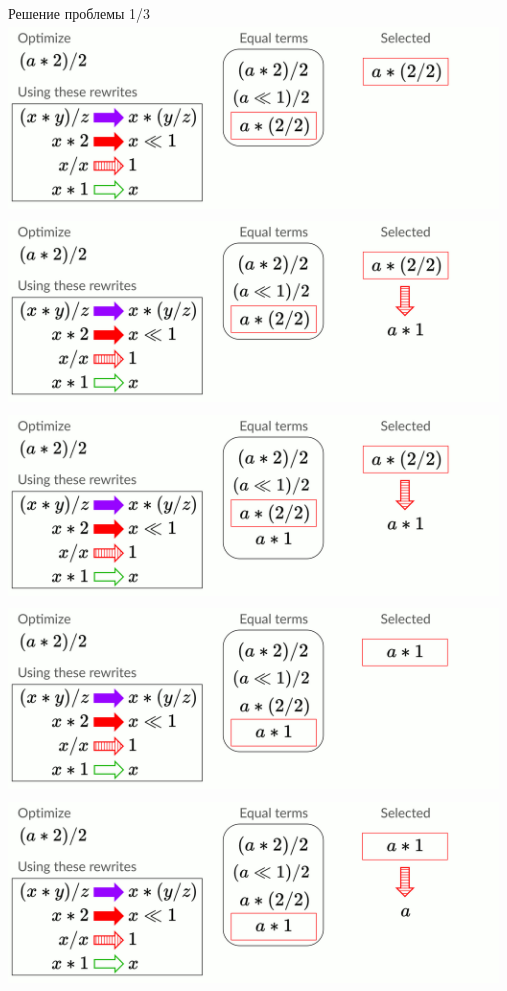 \documentclass[aspectratio=169
  , xcolor={svgnames}
  , russian  %
  ]{beamer}
\begin{document}
\begin{frame}{Решение проблемы 1/3}
{   } 
    {
        \centering
        \includegraphics[width=13cm, height=5cm]{misc/egraphs_images/naive/n-8.jpg}
   } 
    {
        \centering
        \includegraphics[width=13cm, height=5cm]{misc/egraphs_images/naive/n-9.jpg}
   } 
    {
        \centering
        \includegraphics[width=13cm, height=5cm]{misc/egraphs_images/naive/n-10.jpg}
   } 
    {
        \centering
        \includegraphics[width=13cm, height=5cm]{misc/egraphs_images/naive/n-11.jpg}
   } 
    {
        \centering
        \includegraphics[width=13cm, height=5cm]{misc/egraphs_images/naive/n-12.jpg}
}
\end{frame}
\end{document}
